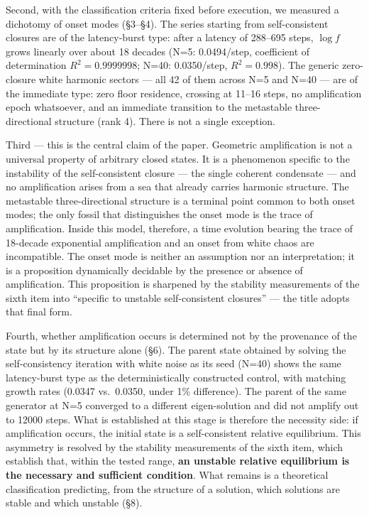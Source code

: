 \documentclass[
  a4paper,
]{article}
\begin{document}
Second, with the classification criteria fixed before execution, we
measured a dichotomy of onset modes (§3--§4). The series starting from
self-consistent closures are of the latency-burst type: after a latency
of 288--695 steps, \(\log f\) grows linearly over about 18 decades (N=5:
0.0494/step, coefficient of determination \(R^2=0.9999998\); N=40:
0.0350/step, \(R^2=0.998\)). The generic zero-closure white harmonic
sectors --- all 42 of them across N=5 and N=40 --- are of the immediate
type: zero floor residence, crossing at 11--16 steps, no amplification
epoch whatsoever, and an immediate transition to the metastable
three-directional structure (rank 4). There is not a single exception.

Third --- this is the central claim of the paper. Geometric
amplification is not a universal property of arbitrary closed states. It
is a phenomenon specific to the instability of the self-consistent
closure --- the single coherent condensate --- and no amplification
arises from a sea that already carries harmonic structure. The
metastable three-directional structure is a terminal point common to
both onset modes; the only fossil that distinguishes the onset mode is
the trace of amplification. Inside this model, therefore, a time
evolution bearing the trace of 18-decade exponential amplification and
an onset from white chaos are incompatible. The onset mode is neither an
assumption nor an interpretation; it is a proposition dynamically
decidable by the presence or absence of amplification. This proposition
is sharpened by the stability measurements of the sixth item into
``specific to unstable self-consistent closures'' --- the title adopts
that final form.

Fourth, whether amplification occurs is determined not by the provenance
of the state but by its structure alone (§6). The parent state obtained
by solving the self-consistency iteration with white noise as its seed
(N=40) shows the same latency-burst type as the deterministically
constructed control, with matching growth rates (0.0347 vs.~0.0350,
under 1\% difference). The parent of the same generator at N=5 converged
to a different eigen-solution and did not amplify out to 12000 steps.
What is established at this stage is therefore the necessity side: if
amplification occurs, the initial state is a self-consistent relative
equilibrium. This asymmetry is resolved by the stability measurements of
the sixth item, which establish that, within the tested range,
\textbf{an unstable relative equilibrium is the necessary and sufficient
condition}. What remains is a theoretical classification predicting,
from the structure of a solution, which solutions are stable and which
unstable (§8).
\end{document}
